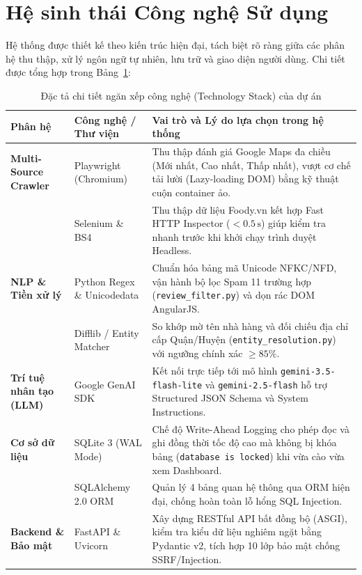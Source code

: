 \documentclass[12pt, a4paper]{article}
\begin{document}
\section{Hệ sinh thái Công nghệ Sử dụng}

Hệ thống được thiết kế theo kiến trúc hiện đại, tách biệt rõ ràng giữa các phân hệ thu thập, xử lý ngôn ngữ tự nhiên, lưu trữ và giao diện người dùng. Chi tiết được tổng hợp trong Bảng~\ref{tab:tech_stack}:

\begin{table}[H]
\centering
\caption{Đặc tả chi tiết ngăn xếp công nghệ (Technology Stack) của dự án}
\label{tab:tech_stack}
\vspace{0.15cm}
\footnotesize
\begin{tabularx}{\textwidth}{l l X}
\toprule
\rowcolor{blue!8}
\textbf{Phân hệ} & \textbf{Công nghệ / Thư viện} & \textbf{Vai trò và Lý do lựa chọn trong hệ thống} \\
\midrule
\textbf{Multi-Source Crawler} & Playwright (Chromium) & Thu thập đánh giá Google Maps đa chiều (Mới nhất, Cao nhất, Thấp nhất), vượt cơ chế tải lười (Lazy-loading DOM) bằng kỹ thuật cuộn container ảo. \\
\addlinespace
 & Selenium \& BS4 & Thu thập dữ liệu Foody.vn kết hợp Fast HTTP Inspector ($<0.5\,\mathrm{s}$) giúp kiểm tra nhanh trước khi khởi chạy trình duyệt Headless. \\
\midrule
\textbf{NLP \& Tiền xử lý} & Python Regex \& Unicodedata & Chuẩn hóa bảng mã Unicode NFKC/NFD, vận hành bộ lọc Spam 11 trường hợp (\texttt{review\_filter.py}) và dọn rác DOM AngularJS. \\
\addlinespace
 & Difflib / Entity Matcher & So khớp mờ tên nhà hàng và đối chiếu địa chỉ cấp Quận/Huyện (\texttt{entity\_resolution.py}) với ngưỡng chính xác $\ge 85\%$. \\
\midrule
\textbf{Trí tuệ nhân tạo (LLM)} & Google GenAI SDK~\cite{google2025} & Kết nối trực tiếp tới mô hình \texttt{gemini-3.5-flash-lite} và \texttt{gemini-2.5-flash} hỗ trợ Structured JSON Schema và System Instructions. \\
\midrule
\textbf{Cơ sở dữ liệu} & SQLite 3 (WAL Mode)~\cite{hipp2024} & Chế độ Write-Ahead Logging cho phép đọc và ghi đồng thời tốc độ cao mà không bị khóa bảng (\texttt{database is locked}) khi vừa cào vừa xem Dashboard. \\
\addlinespace
 & SQLAlchemy 2.0 ORM & Quản lý 4 bảng quan hệ thông qua ORM hiện đại, chống hoàn toàn lỗ hổng SQL Injection. \\
\midrule
\textbf{Backend \& Bảo mật} & FastAPI \& Uvicorn~\cite{ramirez2025} & Xây dựng RESTful API bất đồng bộ (ASGI), kiểm tra kiểu dữ liệu nghiêm ngặt bằng Pydantic v2, tích hợp 10 lớp bảo mật chống SSRF/Injection. \\

\end{tabularx}
\end{table}
\end{document}
